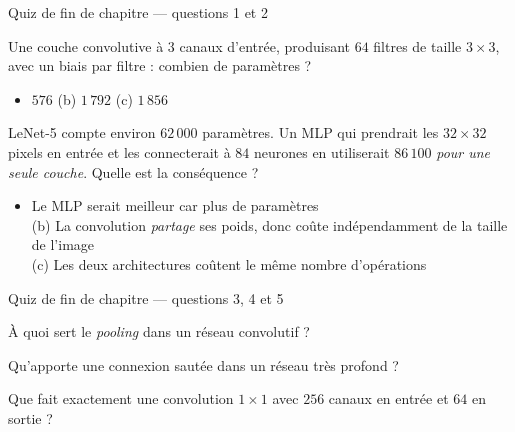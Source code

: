\begin{frame}{Quiz de fin de chapitre --- questions 1 et 2}
\begin{qbox}[Question 1]
Une couche convolutive à $3$ canaux d'entrée, produisant $64$ filtres
de taille $3\times3$, avec un biais par filtre : combien de paramètres ?
\begin{itemize}
  \item[(a)] $576$ \quad (b) $1\,792$ \quad (c) $1\,856$
\end{itemize}
\end{qbox}
\begin{qbox}[Question 2]
LeNet-5 compte environ $62\,000$ paramètres. Un MLP qui prendrait les
$32\times32$ pixels en entrée et les connecterait à $84$ neurones
en utiliserait $86\,100$ \emph{pour une seule couche}. Quelle est la
conséquence ?
\begin{itemize}
  \item[(a)] Le MLP serait meilleur car plus de paramètres \\
  (b) La convolution \emph{partage} ses poids, donc coûte indépendamment
  de la taille de l'image \\
  (c) Les deux architectures coûtent le même nombre d'opérations
\end{itemize}
\end{qbox}
\end{frame}

\begin{frame}{Quiz de fin de chapitre --- questions 3, 4 et 5}
\begin{qbox}[Question 3]
À quoi sert le \emph{pooling} dans un réseau convolutif ?
\end{qbox}
\begin{qbox}[Question 4]
Qu'apporte une connexion sautée dans un réseau très profond ?
\end{qbox}
\begin{qbox}[Question 5]
Que fait exactement une convolution $1\times1$ avec $256$ canaux en entrée
et $64$ en sortie ?
\end{qbox}
\end{frame}

